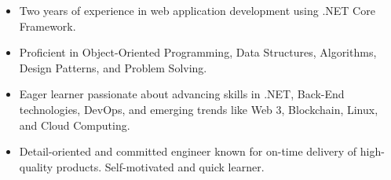 


\begin{itemize}
    \item Two years of experience in web application development using .NET Core Framework.
    \item Proficient in Object-Oriented Programming, Data Structures, Algorithms, Design Patterns, and Problem Solving.
    \item Eager learner passionate about advancing skills in .NET, Back-End technologies, DevOps, and emerging trends like Web 3, Blockchain, Linux, and Cloud Computing.
    \item Detail-oriented and committed engineer known for on-time delivery of high-quality products. Self-motivated and quick learner.
\end{itemize}
